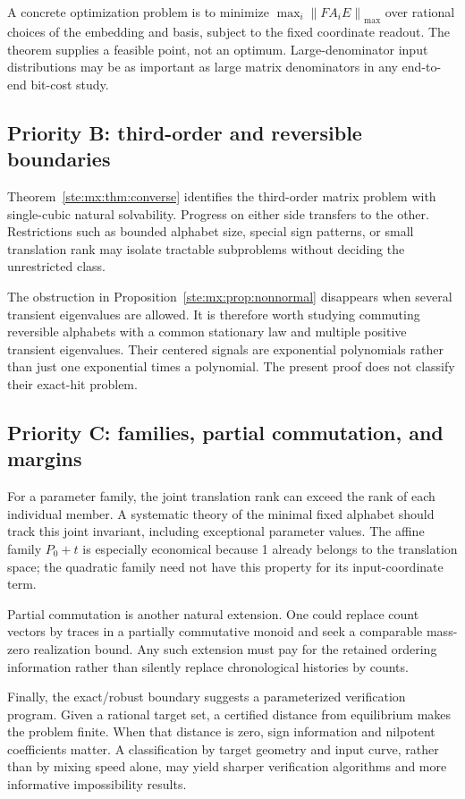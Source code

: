 \documentclass[11pt,letterpaper]{article}
\theoremstyle{definition}
\theoremstyle{remark}
\newcommand{\norm}[1]{\left\lVert #1\right\rVert}
\begin{document}
A concrete optimization problem is to minimize
$\max_i\norm{FA_iE}_{\max}$ over rational choices of the embedding and basis,
subject to the fixed coordinate readout. The theorem supplies a feasible point,
not an optimum. Large-denominator input distributions may be as important as
large matrix denominators in any end-to-end bit-cost study.

\subsection{Priority B: third-order and reversible boundaries}\label{ste:mx:q:reversible}

Theorem~\ref{ste:mx:thm:converse} identifies the third-order matrix problem with
single-cubic natural solvability. Progress on either side transfers to the
other. Restrictions such as bounded alphabet size, special sign patterns, or
small translation rank may isolate tractable subproblems without deciding the
unrestricted class.

The obstruction in Proposition~\ref{ste:mx:prop:nonnormal} disappears when several
transient eigenvalues are allowed. It is therefore worth studying commuting
reversible alphabets with a common stationary law and multiple positive
transient eigenvalues. Their centered signals are exponential polynomials
rather than just one exponential times a polynomial. The present proof does
not classify their exact-hit problem.

\subsection{Priority C: families, partial commutation, and margins}\label{ste:mx:q:families}

For a parameter family, the joint translation rank can exceed the rank of each
individual member. A systematic theory of the minimal fixed alphabet should
track this joint invariant, including exceptional parameter values. The affine
family $P_0+t$ is especially economical because 1 already belongs to the
translation space; the quadratic family need not have this property for its
input-coordinate term.

Partial commutation is another natural extension. One could replace count
vectors by traces in a partially commutative monoid and seek a comparable
mass-zero realization bound. Any such extension must pay for the retained
ordering information rather than silently replace chronological histories by
counts.

Finally, the exact/robust boundary suggests a parameterized verification
program. Given a rational target set, a certified distance from equilibrium
makes the problem finite. When that distance is zero, sign information and
nilpotent coefficients matter. A classification by target geometry and input
curve, rather than by mixing speed alone, may yield sharper verification
algorithms and more informative impossibility results.
\end{document}
